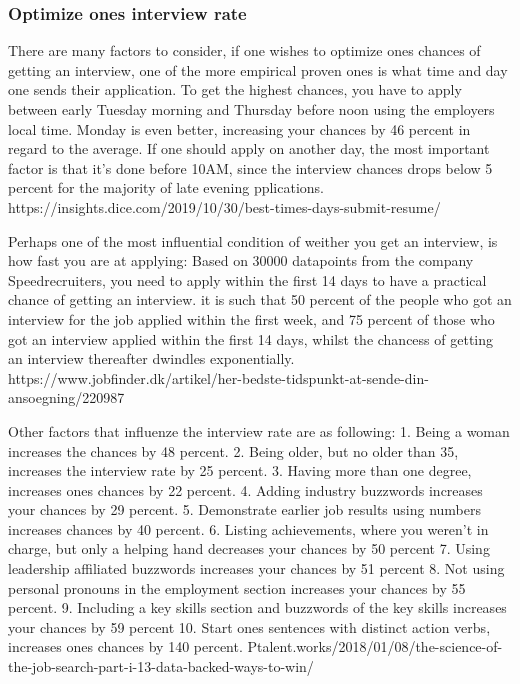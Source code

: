 \subsubsection{Optimize ones interview rate}
There are many factors to consider, if one wishes to optimize ones
chances of getting an interview, one of the more empirical proven ones
is what time and day one sends their application.
To get the highest chances, you have to apply between early Tuesday morning
and Thursday before noon using the employers local time. Monday is even better,
increasing your chances by 46 percent in regard to the average.
If one should apply on another day, the most important factor is that
it's done before 10AM, since the interview chances drops below 5 percent for
the majority of late evening pplications.
https://insights.dice.com/2019/10/30/best-times-days-submit-resume/

Perhaps one of the most influential condition of weither you get an interview,
is how fast you are at applying:
Based on 30000 datapoints from the company Speedrecruiters, you need
to apply within the first 14 days to have a practical chance of getting an
interview. it is such that 50 percent of the people who got an interview
for the job applied within the first week, and 75 percent of those who
got an interview applied within the first 14 days, whilst the chancess of
getting an interview thereafter dwindles exponentially.
https://www.jobfinder.dk/artikel/her-bedste-tidspunkt-at-sende-din-ansoegning/220987

Other factors that influenze the interview rate are as following:
1. Being a woman increases the chances by 48 percent.
2. Being older, but no older than 35, increases the interview rate by 25 percent.
3. Having more than one degree, increases ones chances by 22 percent.
4. Adding industry buzzwords increases your chances by 29 percent.
5. Demonstrate earlier job results using numbers increases chances by 40 percent.
6. Listing achievements, where you weren't in charge, but only a helping hand
 decreases your chances by 50 percent
7. Using leadership affiliated buzzwords increases your chances by 51 percent
8. Not using personal pronouns in the employment section increases your
chances by 55 percent.
9. Including a key skills section and buzzwords of the key skills increases your
 chances by 59 percent
10. Start ones sentences with distinct action verbs, increases ones chances by 140 percent.
Ptalent.works/2018/01/08/the-science-of-the-job-search-part-i-13-data-backed-ways-to-win/


